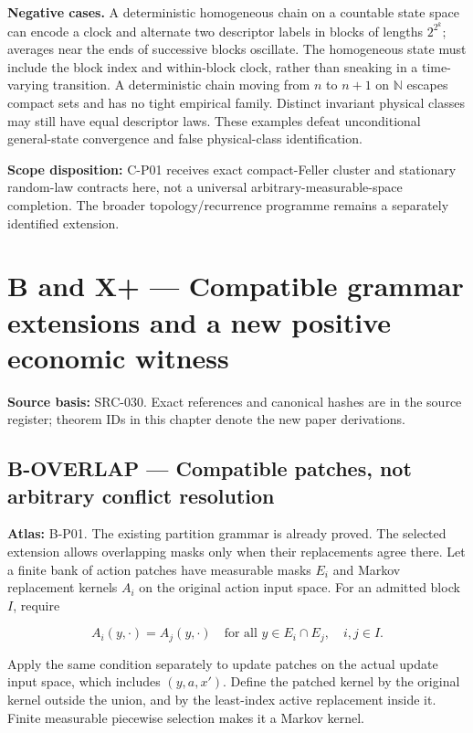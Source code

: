 \documentclass[
  11pt,
  a4paper,
]{article}
\begin{document}
\textbf{Negative cases.} A deterministic homogeneous chain on a
countable state space can encode a clock and alternate two descriptor
labels in blocks of lengths \(2^{2^k}\); averages near the ends of
successive blocks oscillate. The homogeneous state must include the
block index and within-block clock, rather than sneaking in a
time-varying transition. A deterministic chain moving from \(n\) to
\(n+1\) on \(\mathbb N\) escapes compact sets and has no tight empirical
family. Distinct invariant physical classes may still have equal
descriptor laws. These examples defeat unconditional general-state
convergence and false physical-class identification.

\textbf{Scope disposition:} C-P01 receives exact compact-Feller cluster
and stationary random-law contracts here, not a universal
arbitrary-measurable-space completion. The broader topology/recurrence
programme remains a separately identified extension.

\newpage

\section{B and X+ --- Compatible grammar extensions and a new positive
economic
witness}\label{b-and-x-compatible-grammar-extensions-and-a-new-positive-economic-witness}

\textbf{Source basis:} SRC-030. Exact references and canonical hashes
are in the source register; theorem IDs in this chapter denote the new
paper derivations.

\subsection{B-OVERLAP --- Compatible patches, not arbitrary conflict
resolution}\label{b-overlap-compatible-patches-not-arbitrary-conflict-resolution}

\textbf{Atlas:} B-P01. The existing partition grammar is already proved.
The selected extension allows overlapping masks only when their
replacements agree there. Let a finite bank of action patches have
measurable masks \(E_i\) and Markov replacement kernels \(A_i\) on the
original action input space. For an admitted block \(I\), require

\[A_i(y,\cdot)=A_j(y,\cdot)\quad
\text{for all }y\in E_i\cap E_j,\quad i,j\in I.\]

Apply the same condition separately to update patches on the actual
update input space, which includes \((y,a,x')\). Define the patched
kernel by the original kernel outside the union, and by the least-index
active replacement inside it. Finite measurable piecewise selection
makes it a Markov kernel.
\end{document}
